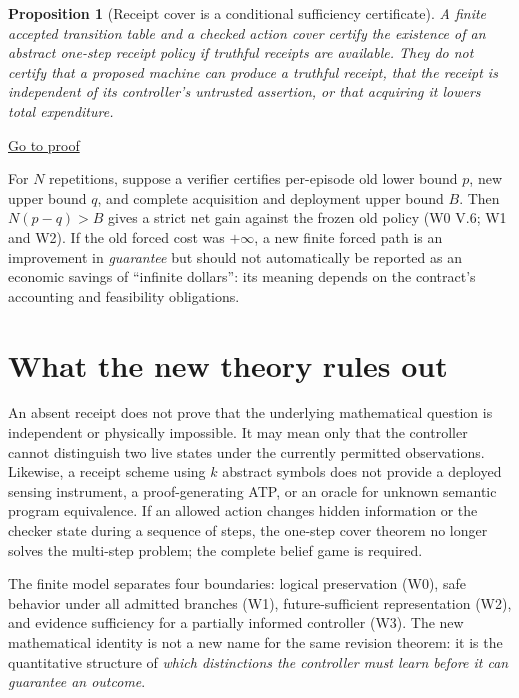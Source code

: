 \documentclass[11pt,letterpaper]{article}
\newtheorem{proposition}[theorem]{Proposition}
\theoremstyle{definition}
\theoremstyle{remark}
\newcommand{\backproof}[1]{\hfill\hyperlink{proof:#1}{\footnotesize Go to proof}}
\begin{document}
\begin{proposition}[Receipt cover is a conditional sufficiency certificate]\label{prop:conditional}\hypertarget{stmt:conditional}{}
A finite accepted transition table and a checked action cover certify the existence of an abstract one-step receipt policy \emph{if truthful receipts are available}. They do not certify that a proposed machine can produce a truthful receipt, that the receipt is independent of its controller's untrusted assertion, or that acquiring it lowers total expenditure.
\end{proposition}\backproof{conditional}

For $N$ repetitions, suppose a verifier certifies per-episode old lower bound $p$, new upper bound $q$, and complete acquisition and deployment upper bound $B$. Then $N(p-q)>B$ gives a strict net gain against the frozen old policy (W0 V.6; W1 and W2). If the old forced cost was $+\infty$, a new finite forced path is an improvement in \emph{guarantee} but should not automatically be reported as an economic savings of ``infinite dollars'': its meaning depends on the contract's accounting and feasibility obligations.

\section{What the new theory rules out}
An absent receipt does not prove that the underlying mathematical question is independent or physically impossible. It may mean only that the controller cannot distinguish two live states under the currently permitted observations. Likewise, a receipt scheme using $k$ abstract symbols does not provide a deployed sensing instrument, a proof-generating ATP, or an oracle for unknown semantic program equivalence. If an allowed action changes hidden information or the checker state during a sequence of steps, the one-step cover theorem no longer solves the multi-step problem; the complete belief game is required.

The finite model separates four boundaries: logical preservation (W0), safe behavior under all admitted branches (W1), future-sufficient representation (W2), and evidence sufficiency for a partially informed controller (W3). The new mathematical identity is not a new name for the same revision theorem: it is the quantitative structure of \emph{which distinctions the controller must learn before it can guarantee an outcome}.
\end{document}
